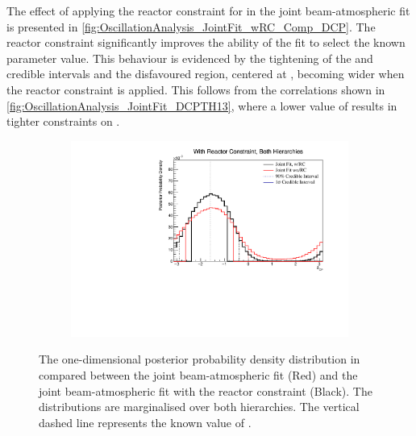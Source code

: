 The effect of applying the reactor constraint for  in the joint beam-atmospheric fit is presented in \autoref{fig:OscillationAnalysis_JointFit_wRC_Comp_DCP}. The reactor constraint significantly improves the ability of the fit to select the known parameter value. This behaviour is evidenced by the tightening of the \quickmath{1\sigma} and  credible intervals and the disfavoured region, centered at , becoming wider when the reactor constraint is applied. This follows from the correlations shown in \autoref{fig:OscillationAnalysis_JointFit_DCPTH13}, where a lower value of  results in tighter constraints on . 

\begin{figure}[h]
  \begin{subfigure}[t]{0.98\textwidth}
    \includegraphics[width=\textwidth, trim={0mm 0mm 0mm 0mm}, clip,page=1]{Figures/OA/JointFit_wRC_Comp/ContourComparison_1D_dcp_BH_2_wRC_woRC_UnSmeared_CredibleInterval.pdf}
  \end{subfigure}
  \caption{The one-dimensional posterior probability density distribution in  compared between the joint beam-atmospheric fit (Red) and the joint beam-atmospheric fit with the reactor constraint (Black). The distributions are marginalised over both hierarchies. The vertical dashed line represents the known value of .}
  \label{fig:OscillationAnalysis_JointFit_wRC_Comp_DCP}
\end{figure}

